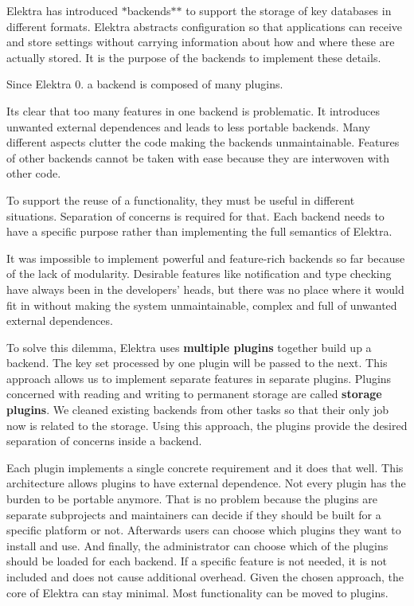 Elektra has introduced $\ast$backends$\ast$$\ast$ to support the storage of key databases in different formats. Elektra abstracts configuration so that applications can receive and store settings without carrying information about how and where these are actually stored. It is the purpose of the backends to implement these details.

Since Elektra 0. a backend is composed of many plugins.

Its clear that too many features in one backend is problematic. It introduces unwanted external dependences and leads to less portable backends. Many different aspects clutter the code making the backends unmaintainable. Features of other backends cannot be taken with ease because they are interwoven with other code.

To support the reuse of a functionality, they must be useful in different situations. Separation of concerns is required for that. Each backend needs to have a specific purpose rather than implementing the full semantics of Elektra.

It was impossible to implement powerful and feature-\/rich backends so far because of the lack of modularity. Desirable features like notification and type checking have always been in the developers' heads, but there was no place where it would fit in without making the system unmaintainable, complex and full of unwanted external dependences.

To solve this dilemma, Elektra uses {\bfseries multiple plugins} together build up a backend. The key set processed by one plugin will be passed to the next. This approach allows us to implement separate features in separate plugins. Plugins concerned with reading and writing to permanent storage are called {\bfseries storage plugins}. We cleaned existing backends from other tasks so that their only job now is related to the storage. Using this approach, the plugins provide the desired separation of concerns inside a backend.

Each plugin implements a single concrete requirement and it does that well. This architecture allows plugins to have external dependence. Not every plugin has the burden to be portable anymore. That is no problem because the plugins are separate subprojects and maintainers can decide if they should be built for a specific platform or not. Afterwards users can choose which plugins they want to install and use. And finally, the administrator can choose which of the plugins should be loaded for each backend. If a specific feature is not needed, it is not included and does not cause additional overhead. Given the chosen approach, the core of Elektra can stay minimal. Most functionality can be moved to plugins.

